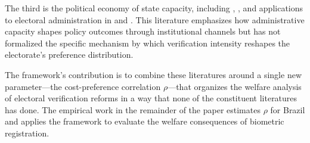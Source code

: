 The third is the political economy of state capacity, including \citet{besleyPersson2011}, \citet{AcemogluRobinson2019}, and applications to electoral administration in \citet{Fujiwara2015VotingTechnoloPolitica} and \citet{Marx2021VoterMobilisaAnd}. This literature emphasizes how administrative capacity shapes policy outcomes through institutional channels but has not formalized the specific mechanism by which verification intensity reshapes the electorate's preference distribution.

The framework's contribution is to combine these literatures around a single new parameter---the cost-preference correlation $\rho$---that organizes the welfare analysis of electoral verification reforms in a way that none of the constituent literatures has done. The empirical work in the remainder of the paper estimates $\rho$ for Brazil and applies the framework to evaluate the welfare consequences of biometric registration.
